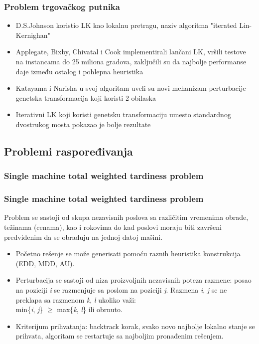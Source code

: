 \documentclass{beamer}
\begin{document}
\begin{frame}[fragile]\frametitle{Problem trgovačkog putnika}
\begin{itemize}
  \item  D.S.Johnson koristio LK kao lokalnu pretragu, naziv algoritma "iterated Lin-Kernighan" 
  \item Applegate, Bixby, Chivatal i Cook implementirali lančani LK, vršili testove na instancama do 25 miliona gradova, zaključili su da najbolje performanse daje između ostalog i pohlepna heuristika
  \item Katayama i Narisha u svoj algoritam uveli su novi mehanizam perturbacije-genetska transformacija koji koristi 2 obilaska
  \item Iterativni LK koji koristi genetsku transformaciju umesto standardnog dvostrukog mosta pokazao je bolje rezultate
\end{itemize}
\end{frame}

\subsection{Problemi raspoređivanja}
\subsubsection{Single machine total weighted tardiness problem}
\begin{frame}[fragile]\frametitle{Single machine total weighted tardiness problem}
Problem se sastoji od skupa nezavisnih poslova sa različitim vremenima obrade, težinama (cenama), kao i rokovima do kad poslovi moraju biti završeni predviđenim da se obrađuju na jednoj datoj mašini. \\
\begin{itemize}
  \item Početno rešenje se može generisati pomoću raznih heuristika konstrukcija (EDD, MDD, AU).
  \item Perturbacija se sastoji od niza proizvoljnih nezavisnih poteza razmene: posao na poziciji \textit{i} se razmenjuje sa poslom na poziciji \textit{j}. Razmena \textit{i}, \textit{j} se ne preklapa sa razmenom \textit{k}, \textit{l} ukoliko važi:\\ min\{\textit{i}, \textit{j}\} $\geq$ max\{\textit{k}, \textit{l}\} ili obrnuto.
  \item Kriterijum prihvatanja: backtrack korak, svako novo najbolje lokalno stanje se prihvata, algoritam se restartuje sa najboljim pronađenim rešenjem.
\end{itemize}
\end{frame}
\end{document}
